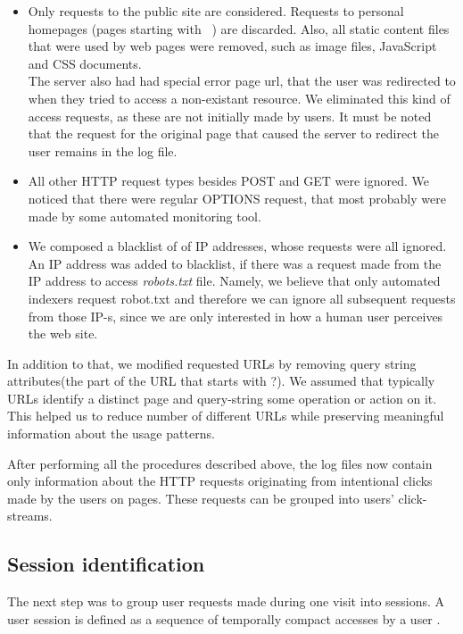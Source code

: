 \documentclass[english,a4paper]{article}
\begin{document}
\begin{itemize}
\item Only requests to the public site are considered. Requests to personal homepages (pages starting with ~) are discarded. Also, all static content files that were used by web pages were removed, such as image files, JavaScript and CSS documents. \\ The server also had had special error page url, that the user was redirected to when they tried to access a non-existant resource. We eliminated this kind of access requests, as these are not initially made by users. It must be noted that the request for the original page that caused the server to redirect the user remains in the log file.
  
\item All other HTTP request types besides POST and GET were ignored. We noticed that there were regular OPTIONS request, that most probably were made by some automated monitoring tool. 
  
\item We composed a blacklist of of IP addresses, whose requests were all ignored. An IP address was added to blacklist, if there was a request made from the IP address to access \emph{robots.txt} file. Namely, we believe that only automated indexers request robot.txt and therefore we can ignore all subsequent requests from those IP-s, since we are only interested in how a human user perceives the web site. 
\end{itemize}


In addition to that, we modified requested URLs by removing query string attributes(the part of the URL that starts with ?). We assumed that typically URLs identify a distinct page and query-string some operation or action on it. This helped us to reduce number of different URLs while preserving meaningful information about the usage patterns.

After performing all the procedures described above, the log files now contain only information about the HTTP requests originating from intentional clicks made by the users on pages. These requests can be grouped into users' click-streams.











\subsection{Session identification}
The next step was to group user requests made during one visit into sessions. A user session is defined as a sequence of temporally compact accesses by a user \cite{on_mining_logs}.
\end{document}
